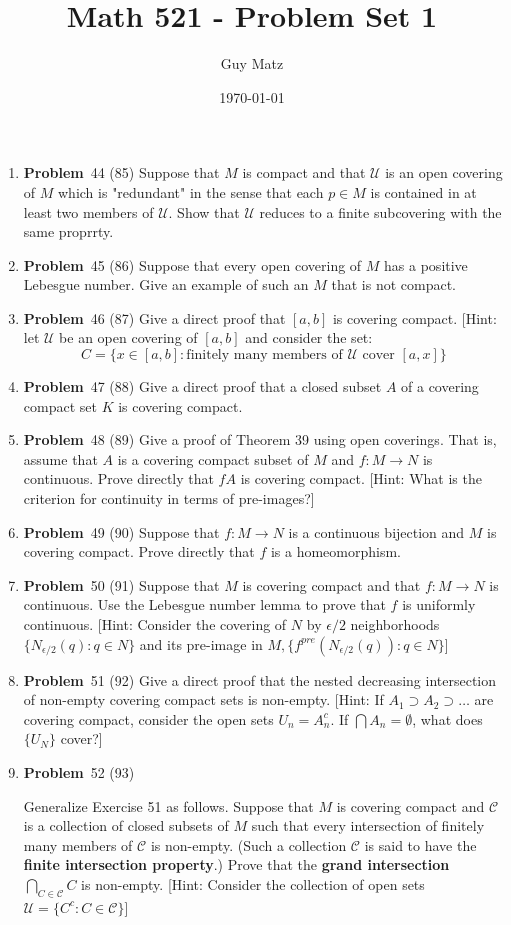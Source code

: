 \documentclass[12pt]{amsart}
\title{\textbf{Math 521 - Problem Set 1}}
\author{Guy Matz}
\date{\today}
\theoremstyle{definition}
\newcommand{\mcU}{\mathcal{U}}
\newcommand{\itep}{\item {\bfseries Problem}\ }
\begin{document}
 


\begin{enumerate}[series=p]
\itep 44 (85)
Suppose that $M$ is compact and that $\mcU$ is an open covering of $M$ which is "redundant" in the sense that each $p \in M$ is contained in at least two members of $\mcU$.  Show that $\mcU$ reduces to a finite subcovering with the same proprrty.
\newpage

\itep 45 (86)
Suppose that every open covering of $M$ has a positive Lebesgue number.  Give an example of such an $M$ that is not compact.
\newpage

\itep 46 (87)
Give a direct proof that $[a,b]$ is covering compact. [Hint: let $\mcU$ be an open covering of $[a,b]$ and consider the set:
$$C = \{x \in [a,b]: \text{finitely many members of  } \mcU \text{ cover }[a,x] \}$$
\newpage

\itep 47 (88)
Give a direct proof that a closed subset $A$ of a covering compact set $K$ is covering compact.
\newpage

\itep 48 (89)
Give a proof of Theorem 39 using open coverings.  That is, assume that $A$ is a covering compact subset of $M$ and $f: M \to N$ is continuous.  Prove directly that $fA$ is covering compact. [Hint: What is the criterion for continuity in terms of pre-images?]
\newpage

\itep 49 (90)
Suppose that $f: M \to N$ is a continuous bijection and $M$ is covering compact.  Prove directly that $f$ is a homeomorphism.
\newpage

\itep 50 (91)
Suppose that $M$ is covering compact and that $f:M \to N$ is continuous.  Use the Lebesgue number lemma to prove that $f$ is uniformly continuous.  [Hint: Consider the covering of $N$ by $\epsilon/2$ neighborhoods $\{N_{\epsilon/2}(q): q \in N\}$ and its pre-image in $M, \{f^{pre}(N_{\epsilon/2}(q)) :q \in N \}$]
\newpage

\itep 51 (92)
Give a direct proof that the nested decreasing intersection of non-empty covering compact sets is non-empty.  [Hint: If $A_1 \supset A_2 \supset \dots$ are covering compact, consider the open sets $U_n = A^c_n$.  If $\bigcap A_n = \emptyset$, what does $\{U_N \}$ cover?] 
\newpage

\itep 52 (93)

Generalize Exercise 51 as follows.  Suppose that $M$ is covering compact and $\mathcal{C}$ is a collection of closed subsets of $M$ such that every intersection of finitely many members of $\mathcal{C}$ is non-empty.  (Such a collection $\mathcal{C}$ is said to have the \textbf{finite intersection property}.)  Prove that the \textbf{grand intersection} $\bigcap_{C \in \mathcal{C}}C$ is non-empty.  [Hint: Consider the collection of open sets $\mcU = \{C^c : C \in \mathcal{C}\}$]
\newpage


\end{enumerate}
\end{document}
